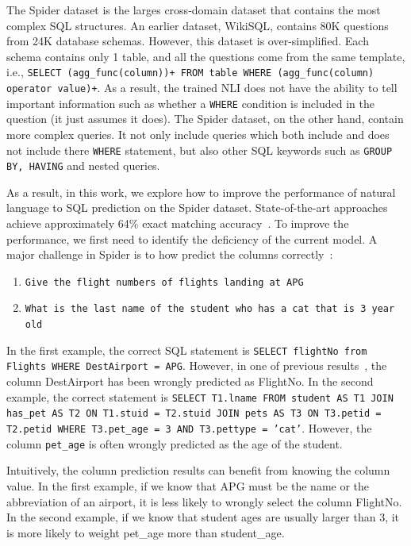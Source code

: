 The Spider dataset is the larges cross-domain dataset that contains the most complex SQL structures. An earlier dataset, WikiSQL, contains 80K questions from 24K database schemas. However, this dataset is over-simplified. Each schema contains only 1 table, and all the questions come from the same template, i.e., \texttt{SELECT (agg\_func(column))+ FROM table WHERE (agg\_func(column) operator value)+}. As a result, the trained NLI does not have the ability to tell important information such as whether a \texttt{WHERE} condition is included in the question (it just assumes it does). The Spider dataset, on the other hand, contain more complex queries. It not only include queries which both include and does not include there \texttt{WHERE} statement, but also other SQL keywords such as \texttt{GROUP BY, HAVING} and nested queries. 

As a result, in this work, we explore how to improve the performance of natural language to SQL prediction on the Spider dataset. State-of-the-art approaches achieve approximately 64\% exact matching accuracy~\cite{guo2019towards}. To improve the performance, we first need to identify the deficiency of the current model. A major challenge in Spider is to how predict the columns correctly~\cite{yu2018syntaxsqlnet}:

\begin{enumerate}
\item \texttt{Give the flight numbers of flights landing at APG}
\item \texttt{What is the last name of the student who has a cat that is 3 year old}
\end{enumerate}

In the first example, the correct SQL statement is \texttt{SELECT flightNo from Flights WHERE DestAirport = APG}. However, in one of previous results~\cite{yu2018syntaxsqlnet}, the column DestAirport has been wrongly predicted as FlightNo. In the second example, the correct statement is \texttt{SELECT T1.lname FROM student AS T1 JOIN has\_pet AS T2 ON T1.stuid  =  T2.stuid JOIN pets AS T3 ON T3.petid  =  T2.petid WHERE T3.pet\_age  =  3 AND T3.pettype  =  'cat'}. However, the column \texttt{pet\_age} is often wrongly predicted as the age of the student. 

Intuitively, the column prediction results can benefit from knowing the column value. In the first example, if we know that APG must be the name or the abbreviation of an airport, it is less likely to wrongly select the column FlightNo. In the second example, if we know that student ages are usually larger than 3, it is more likely to weight pet\_age more than student\_age. 


